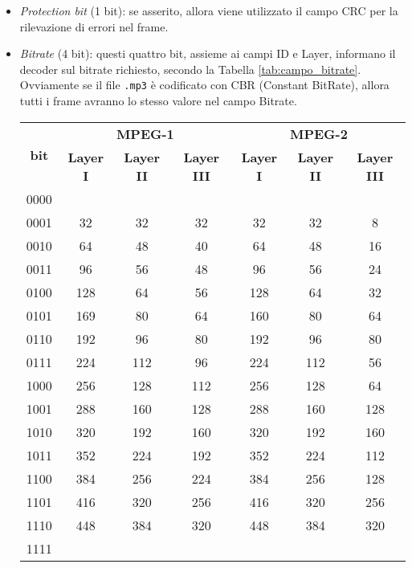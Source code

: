 \begin{itemize}
			\item \textit{Protection bit} (1 bit): se asserito, allora viene utilizzato il campo CRC per la rilevazione di errori nel frame.
			
			\item \textit{Bitrate} (4 bit): questi quattro bit, assieme ai campi ID e Layer, informano il decoder sul bitrate richiesto, secondo la Tabella \ref{tab:campo_bitrate}. Ovviamente se il file \texttt{.mp3} è codificato con CBR (Constant BitRate), allora tutti i frame avranno lo stesso valore nel campo Bitrate.
			
				\begin{table}[h!]
					\centering
					\begin{tabular}{c|c|c|c|c|c|c|}
						\multirow{2}{*}{\textbf{bit}} & \multicolumn{3}{|c|}{\textbf{MPEG-1}} & \multicolumn{3}{|c|}{\textbf{MPEG-2}}\\
						\cline{2-7}
						& \textbf{Layer I} & \textbf{Layer II} & \textbf{Layer III} & \textbf{Layer I} & \textbf{Layer II} & \textbf{Layer III}\\
						\hline
						0000 & & & & & &\\
						\hline
						0001 & 32 & 32 & 32 & 32 & 32 & 8\\
						\hline
						0010 & 64 & 48 & 40 & 64 & 48 & 16\\
						\hline
						0011 & 96 & 56 & 48 & 96 & 56 & 24\\
						\hline
						0100 & 128 & 64 & 56 & 128 & 64 & 32\\
						\hline
						0101 & 169 & 80 & 64 & 160 & 80 & 64\\
						\hline
						0110 & 192 & 96 & 80 & 192 & 96 & 80\\
						\hline
						0111 & 224 & 112 & 96 & 224 & 112 & 56\\
						\hline
						
						1000 & 256 & 128 & 112 & 256 & 128 & 64\\
						\hline
						1001 & 288 & 160 & {\color{red} 128} & 288 & 160 & {\color{red} 128}\\
						\hline
						1010 & 320 & 192 & 160 & 320 & 192 & 160\\
						\hline
						1011 & 352 & 224 & 192 & 352 & 224 & 112\\
						\hline
						1100 & 384 & 256 & 224 & 384 & 256 & 128\\
						\hline
						1101 & 416 & 320 & 256 & 416 & 320 & 256\\
						\hline
						1110 & 448 & 384 & 320 & 448 & 384 & 320\\
						\hline
						1111 & & & & & &\\
						\hline
						

\end{tabular}
\end{table}
\end{itemize}
